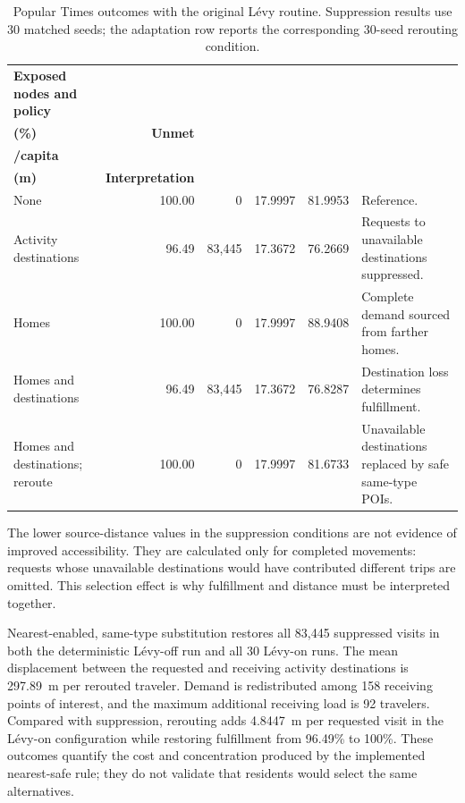 \begin{table}[ht]
\centering
\footnotesize
\caption{Popular Times outcomes with the original L\'evy routine. Suppression results use 30 matched seeds; the adaptation row reports the corresponding 30-seed rerouting condition.}
\label{tbl:popular_times_disruption}
\begin{tabularx}{\linewidth}{@{}lrrrrX@{}}
\toprule
\textbf{Exposed nodes and policy} &
\shortstack{\textbf{Fulfillment}\\\textbf{(\%)}} &
\textbf{Unmet} &
\shortstack{\textbf{Travelers}\\\textbf{/capita}} &
\shortstack{\textbf{Source distance}\\\textbf{(m)}} &
\textbf{Interpretation} \\
\midrule
None
    & 100.00 & 0 & 17.9997 & 81.9953 & Reference. \\
Activity destinations
    & 96.49 & 83,445 & 17.3672 & 76.2669 & Requests to unavailable destinations suppressed. \\
Homes
    & 100.00 & 0 & 17.9997 & 88.9408 & Complete demand sourced from farther homes. \\
Homes and destinations
    & 96.49 & 83,445 & 17.3672 & 76.8287 & Destination loss determines fulfillment. \\
Homes and destinations; reroute
    & 100.00 & 0 & 17.9997 & 81.6733 & Unavailable destinations replaced by safe same-type POIs. \\
\bottomrule
\end{tabularx}
\end{table}

The lower source-distance values in the suppression conditions are not evidence of improved accessibility. They are calculated only for completed movements: requests whose unavailable destinations would have contributed different trips are omitted. This selection effect is why fulfillment and distance must be interpreted together.

Nearest-enabled, same-type substitution restores all 83,445 suppressed visits in both the deterministic L\'evy-off run and all 30 L\'evy-on runs. The mean displacement between the requested and receiving activity destinations is 297.89~m per rerouted traveler. Demand is redistributed among 158 receiving points of interest, and the maximum additional receiving load is 92 travelers. Compared with suppression, rerouting adds 4.8447~m per requested visit in the L\'evy-on configuration while restoring fulfillment from 96.49\% to 100\%. These outcomes quantify the cost and concentration produced by the implemented nearest-safe rule; they do not validate that residents would select the same alternatives.

